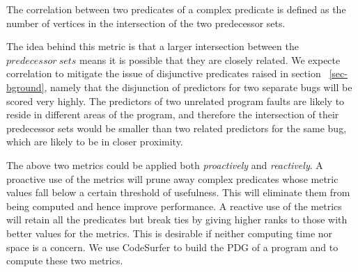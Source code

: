 \begin{defn}
\label{dfn5}
The correlation between two predicates of a complex predicate is defined as the number of vertices in the intersection of the two predecessor sets.
\end{defn}

The idea behind this metric is that a larger intersection between the $predecessor\ sets$ means it is possible that they are closely related.  We expecte correlation to mitigate the issue of disjunctive predicates raised in section ~\ref{sec-bground}, namely that the disjunction of predictors for two separate bugs will be scored very highly.  The predictors of two unrelated program faults are likely to reside in different areas of the program, and therefore the intersection of their predecessor sets would be smaller than two related predictors for the same bug, which are likely to be in closer proximity.

The above two metrics could be applied both \emph{proactively} and \emph{reactively}.  A proactive use of the metrics will prune away complex predicates whose metric values fall below a certain threshold of usefulness.  This will eliminate them from being computed and hence improve performance.  A reactive use of the metrics will retain all the predicates but break ties by giving higher ranks to those with better values for the metrics. This is desirable if neither computing time nor space is a concern.  We use CodeSurfer to build the PDG of a program and to compute these two metrics.


